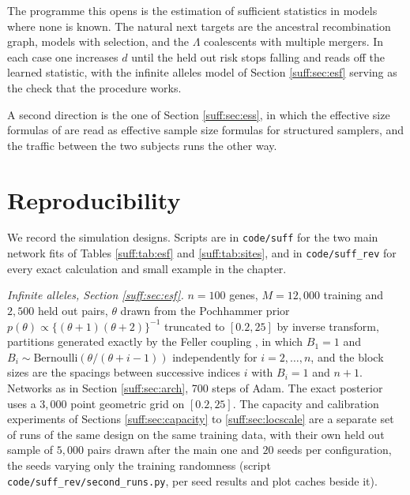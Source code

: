 The programme this opens is the estimation of sufficient statistics in models where none is
known. The natural next targets are the ancestral recombination graph, models with selection,
and the $\Lambda$ coalescents with multiple mergers. In each case one increases $d$ until the
held out risk stops falling and reads off the learned statistic, with the infinite alleles
model of Section \ref{suff:sec:esf} serving as the check that the procedure works.

A second direction is the one of Section \ref{suff:sec:ess}, in which the effective size
formulas of \citet{suff:ewenshossjer2025} are read as effective sample size formulas for
structured samplers, and the traffic between the two subjects runs the other way.

\section{Reproducibility}
\label{suff:sec:repro}

We record the simulation designs. Scripts are in \texttt{code/suff} for the two main network fits of Tables \ref{suff:tab:esf} and \ref{suff:tab:sites}, and
in \texttt{code/suff\_rev} for every exact calculation and small example in the chapter.

\emph{Infinite alleles, Section \ref{suff:sec:esf}.} $n=100$ genes, $M=12{,}000$ training and
$2{,}500$ held out pairs, $\theta$ drawn from the Pochhammer prior
$p(\theta)\propto\{(\theta+1)(\theta+2)\}^{-1}$ truncated to $[0.2,25]$ by inverse transform,
partitions generated exactly by the Feller coupling \citep{suff:arratia1992}, in which
$B_1=1$ and $B_i\sim\mathrm{Bernoulli}(\theta/(\theta+i-1))$ independently for
$i=2,\dots,n$, and the block sizes are the spacings between successive indices $i$ with
$B_i=1$ and $n+1$. Networks as in Section \ref{suff:sec:arch}, 700 steps of Adam. The exact
posterior uses a $3{,}000$ point geometric grid on $[0.2,25]$. The capacity and calibration
experiments of Sections \ref{suff:sec:capacity} to \ref{suff:sec:locscale} are a separate set
of runs of the same design on the same training data, with their own held out sample of
$5{,}000$ pairs drawn after the main one and $20$ seeds per configuration, the seeds varying
only the training randomness (script \texttt{code/suff\_rev/second\_runs.py}, per seed
results and plot caches beside it).

